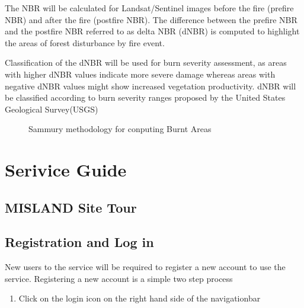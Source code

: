 \documentclass[letterpaper,10pt,english]{sphinxmanual}
\let\sphinxpxdimen\pdfpxdimen\else\newdimen\sphinxpxdimen
\begin{document}
\sphinxAtStartPar
The NBR will be calculated for Landsat/Sentinel images before the fire (pre\sphinxhyphen{}fire NBR) and after the fire (post\sphinxhyphen{}fire NBR). The difference between the pre\sphinxhyphen{}fire NBR and the post\sphinxhyphen{}fire NBR referred to as delta NBR (dNBR) is computed to highlight the areas of forest disturbance by fire event.

\sphinxAtStartPar
Classification of the dNBR will be used for burn severity assessment, as areas with higher dNBR values indicate more severe damage whereas areas with negative dNBR values might show increased vegetation productivity. dNBR will be classified according to burn severity ranges proposed by the United States Geological Survey(USGS)

\begin{figure}[H]
\centering
\capstart

\noindent\sphinxincludegraphics[width=700\sphinxpxdimen,height=500\sphinxpxdimen]{{Forest_fires}.png}
\caption{Sammury methodology for conputing Burnt Areas}\label{\detokenize{Background/Forest_change:id1}}\end{figure}

\sphinxstepscope


\chapter{Serivice Guide}
\label{\detokenize{Service/Service_Guide:serivice-guide}}\label{\detokenize{Service/Service_Guide::doc}}

\section{MISLAND Site Tour}
\label{\detokenize{Service/Service_Guide:misland-site-tour}}



\section{Registration and Log in}
\label{\detokenize{Service/Service_Guide:registration-and-log-in}}
\sphinxAtStartPar
New users to the service will be required to register a new account to use the service. Registering a new account is a simple two step process
\begin{enumerate}
%
\item {} 
\sphinxAtStartPar
Click on the log\sphinxhyphen{}in icon on the right hand side of the navigation\sphinxhyphen{}bar

\end{enumerate}
\end{document}
